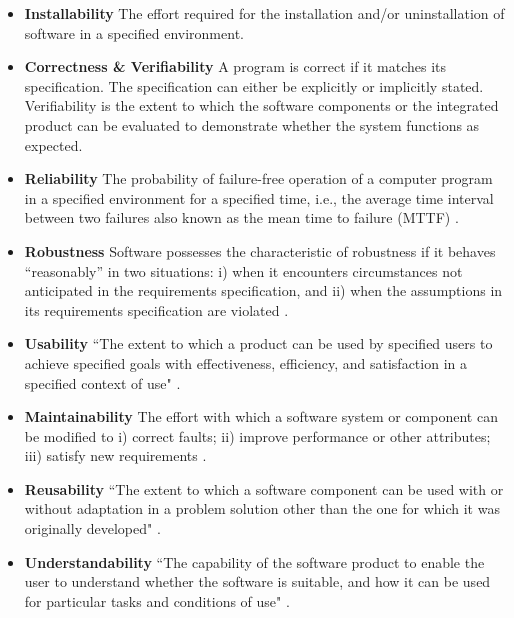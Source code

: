 \documentclass[3p, 12pt,authoryear]{elsarticle}
\begin{document}
\begin{itemize}
	\item \textbf{Installability} The effort required for the installation
    and/or uninstallation of software in a specified environment.

	\item \textbf{Correctness \& Verifiability} A program is correct if it
    matches its specification.  The specification can either be explicitly or
    implicitly stated.  Verifiability is the extent to which the software
    components or the integrated product can be evaluated to demonstrate whether
    the system functions as expected.

	\item \textbf{Reliability} The probability of failure-free operation of a
	computer program in a specified environment for a specified time, i.e., the
	average time interval between two failures also known as the mean time to
	failure (MTTF) \citep{musa1987software} \citep{GhezziEtAl2003}.

	\item \textbf{Robustness} Software possesses the characteristic of
	robustness if it behaves ``reasonably'' in two situations: i) when it
	encounters circumstances not anticipated in the requirements specification,
	and ii) when the assumptions in its requirements specification are violated
	\citep{ghezzi1991fundamentals} \citep{boehm2007software}.

	\item \textbf{Usability} ``The extent to which a product can be used by
	specified users to achieve specified goals with effectiveness, efficiency,
	and satisfaction in a specified context of use" \citep{ISO/TR16982:2002}
	\citep{ISO9241-11:2018}.

	\item \textbf{Maintainability} The effort with which a software system or
	component can be modified to i) correct faults; ii) improve performance or
	other attributes; iii) satisfy new requirements
	\citep{IEEEStdGlossarySET1990} \citep{boehm2007software}.

	\item \textbf{Reusability} ``The extent to which a software component can be
	used with or without adaptation in a problem solution other than the one for
	which it was originally developed" \citep{kalagiakos2003non}.

	\item \textbf{Understandability} ``The capability of the software product to
	enable the user to understand whether the software is suitable, and how it
	can be used for particular tasks and conditions of use" \citep{iso2001iec}.


\end{itemize}
\end{document}
